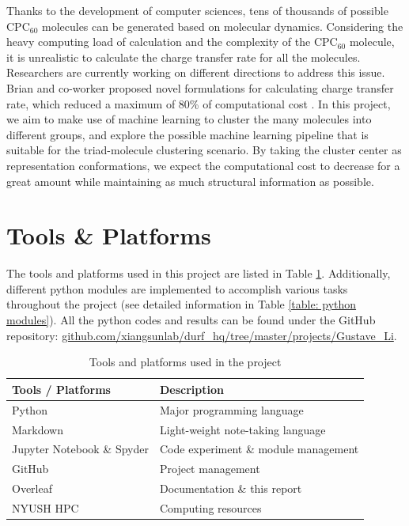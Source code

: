 \documentclass[a4paper]{article}
\begin{document}
Thanks to the development of computer sciences, tens of thousands of possible \(\text{CPC}_{60}\) molecules can be generated based on molecular dynamics. Considering the heavy computing load of calculation and the complexity of the \(\text{CPC}_{60}\) molecule, it is unrealistic to calculate the charge transfer rate for all the molecules. Researchers are currently working on different directions to address this issue. Brian and co-worker proposed novel formulations for calculating charge transfer rate, which reduced a maximum of 80\% of computational cost \cite{BrianDomi}. In this project, we aim to make use of machine learning to cluster the many molecules into different groups, and explore the possible machine learning pipeline that is suitable for the triad-molecule clustering scenario. By taking the cluster center as representation conformations, we expect the computational cost to decrease for a great amount while maintaining as much structural information as possible.

\section{Tools \& Platforms}

The tools and platforms used in this project are listed in Table \ref{table: tools & platforms}. Additionally, different python modules are implemented to accomplish various tasks throughout the project (see detailed information in Table \ref{table: python modules}). All the python codes and results can be found under the GitHub repository: \href{https://github.com/xiangsunlab/durf_hq/tree/master/projects/Gustave_Li}{github.com/xiangsunlab/durf\_hq/tree/master/projects/Gustave\_Li}.

\begin{table}[h!]
    \centering
    \caption{Tools and platforms used in the project} 
    \begin{tabular}{l|l}
    \hline \hline
        \textbf{Tools / Platforms} & \textbf{Description} \\
        \hline
        Python & Major programming language \\
        Markdown & Light-weight note-taking language \\
        Jupyter Notebook \& Spyder & Code experiment \& module management \\
        GitHub & Project management \\
        Overleaf & Documentation \& this report \\
        NYUSH HPC & Computing resources \\
        \hline \hline
    \end{tabular}
    \label{table: tools & platforms}
\end{table}
\end{document}
